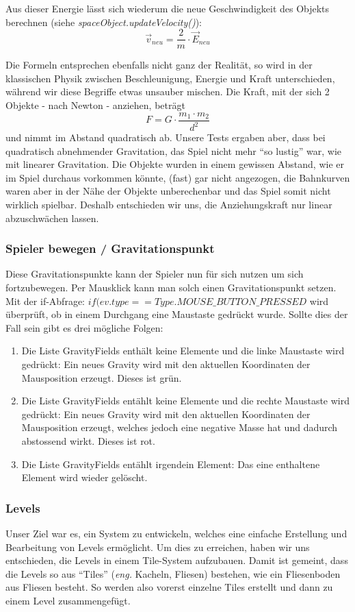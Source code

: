 \documentclass[12pt,a4paper]{scrartcl}
\newcommand{\q}[1]{``#1''}
\begin{document}
Aus dieser Energie lässt sich wiederum die neue Geschwindigkeit des Objekts berechnen (siehe \textit{spaceObject.updateVelocity()}):
\[ \vec{v}_{neu} = \frac{2}{m} \cdot \vec{E}_{neu}\] 

Die Formeln entsprechen ebenfalls nicht ganz der Realität, so wird in der klassischen Physik zwischen Beschleunigung, Energie und Kraft unterschieden,
während wir diese Begriffe etwas unsauber mischen. Die Kraft, mit der sich 2 Objekte - nach Newton - anziehen, beträgt
\[ F = G \cdot \frac{m_1 \cdot m_2}{d^2} \]
und nimmt im Abstand quadratisch ab. Unsere Tests ergaben aber, dass bei quadratisch abnehmender Gravitation, das
Spiel nicht mehr \q{so lustig} war, wie mit linearer Gravitation. Die Objekte wurden in einem gewissen Abstand, wie er
im Spiel durchaus vorkommen könnte, (fast) gar nicht angezogen, die Bahnkurven waren aber in der Nähe der Objekte
unberechenbar und das Spiel somit nicht wirklich spielbar. Deshalb entschieden wir uns, die Anziehungskraft
nur linear abzuschwächen lassen.


\subsubsection{Spieler bewegen / Gravitationspunkt}
Diese Gravitationspunkte kann der Spieler nun für sich nutzen um sich fortzubewegen.
Per Mausklick kann man solch einen Gravitationspunkt setzen.
Mit der if-Abfrage: 
$if(ev.type == Type.MOUSE\_BUTTON\_PRESSED$
wird überprüft, ob in einem Durchgang eine Maustaste gedrückt wurde. Sollte dies der Fall sein gibt es drei mögliche Folgen:
\begin{enumerate}
\item Die Liste GravityFields enthält keine Elemente und die linke Maustaste wird gedrückt: Ein neues Gravity wird mit den aktuellen Koordinaten der Mausposition erzeugt. Dieses ist grün.
\item Die Liste GravityFields entählt keine Elemente und die rechte  Maustaste wird gedrückt: Ein neues Gravity wird mit den aktuellen Koordinaten der Mausposition erzeugt, welches jedoch eine negative Masse hat und dadurch abstossend wirkt. Dieses ist rot.
\item Die Liste GravityFields entählt irgendein Element:
Das eine enthaltene Element wird wieder gelöscht.
\end{enumerate}
\subsubsection{Levels}
Unser Ziel war es, ein System zu entwickeln, welches eine einfache Erstellung und Bearbeitung von Levels ermöglicht. Um dies zu erreichen, haben wir uns entschieden, die Levels in einem Tile-System aufzubauen. Damit ist gemeint, dass die Levels so aus \q{Tiles} (\textit{eng.} Kacheln, Fliesen) bestehen, wie ein Fliesenboden aus Fliesen besteht. So werden also vorerst einzelne Tiles erstellt und dann zu einem Level zusammengefügt.\\
\end{document}
